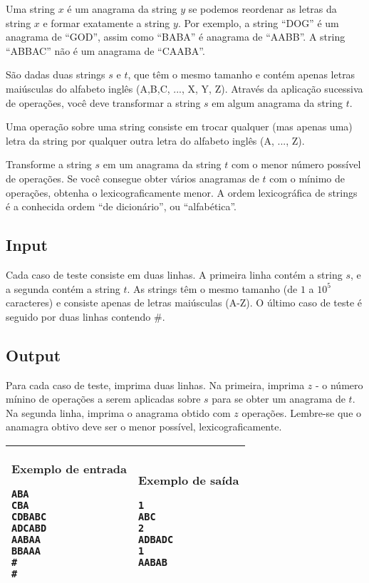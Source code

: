 Uma string $x$ é um anagrama da string $y$ se podemos reordenar as letras da
string $x$ e formar exatamente a string $y$. Por exemplo, a string ``DOG'' é
um anagrama de ``GOD'', assim como ``BABA'' é anagrama de ``AABB''. A string
``ABBAC'' não é um anagrama de ``CAABA''.

São dadas duas strings $s$ e $t$, que têm o mesmo tamanho e contém apenas
letras maiúsculas do alfabeto inglês (A,B,C, ..., X, Y, Z). Através da
aplicação sucessiva de operações, você deve transformar a string $s$ em
algum anagrama da string $t$.

Uma operação sobre uma string consiste em trocar qualquer (mas apenas uma)
letra da string por qualquer outra letra do alfabeto inglês (A, ..., Z).

Transforme a string $s$ em um anagrama da string $t$ com o menor número
possível de operações. Se você consegue obter vários anagramas de $t$ com o
mínimo de operações, obtenha o lexicograficamente menor. A ordem
lexicográfica de strings é a conhecida ordem ``de dicionário'', ou
``alfabética''.

\subsection*{Input}

Cada caso de teste consiste em duas linhas. A primeira linha contém a string
$s$, e a segunda contém a string $t$. As strings têm o mesmo tamanho (de $1$
a $10^5$ caracteres) e consiste apenas de letras maiúsculas (A-Z). O último
caso de teste é seguido por duas linhas contendo $\#$.

\subsection*{Output}

Para cada caso de teste, imprima duas linhas. Na primeira, imprima $z$ - o
número mínino de operações a serem aplicadas sobre $s$ para se obter um
anagrama de $t$. Na segunda linha, imprima o anagrama obtido com $z$
operações. Lembre-se que o anamagra obtivo deve ser o menor possível,
lexicograficamente.

\begin{table}[!h]
\centering
\begin{tabular}{|l|l|}
\hline
\begin{minipage}[t]{3in}
\textbf{Exemplo de entrada}
\begin{verbatim}
ABA
CBA
CDBABC
ADCABD
AABAA
BBAAA
#
#
\end{verbatim}
\vspace{1mm}
\end{minipage}
&

\begin{minipage}[t]{3in}
\textbf{Exemplo de saída}
\begin{verbatim}
1
ABC
2
ADBADC
1
AABAB
\end{verbatim}
\vspace{1mm}
\end{minipage} \\
\hline
\end{tabular}
\end{table}

\newpage
